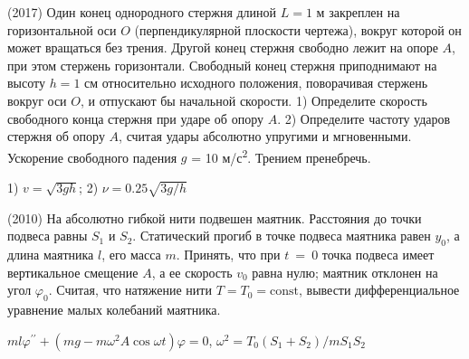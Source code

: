 \begin{ex}
(2017) Один конец однородного стержня длиной $L=1$ м закреплен на горизонтальной оси $O$ (перпендикулярной плоскости чертежа), вокруг которой он может вращаться без трения. Другой конец стержня свободно лежит на опоре $A$, при этом стержень горизонтали. Свободный конец стержня приподнимают на высоту $h = 1$ см относительно исходного положения, поворачивая стержень
вокруг оси $O$, и отпускают бы начальной скорости. 1) Определите скорость
свободного конца стержня при ударе об опору $A$. 2) Определите частоту ударов
стержня об опору $A$, считая удары абсолютно упругими и мгновенными.
Ускорение свободного падения $g$ = 10 м/с\textsuperscript{2}. Трением пренебречь.
\begin{center}

\end{center}
\begin{ans}
1) $v=\sqrt{3gh}$; 2) $\nu = 0.25\sqrt{3g/h }$
\end{ans}
\end{ex}

\begin{ex}
(2010) На абсолютно гибкой нити подвешен маятник. Расстояния до точки подвеса равны $S_1$ и $S_2$. 
Статический прогиб в точке подвеса маятника равен $y_0$, а длина маятника $l$, его масса $m$. 
Принять, что при $t$~=~0 точка подвеса имеет вертикальное смещение $A$, а ее скорость $v_0$ равна нулю; маятник отклонен на угол $\varphi_0$. 
Считая, что натяжение нити $T = T_0 = \text{const}$, вывести дифференциальное уравнение малых колебаний маятника.
\begin{center}

\end{center}
\begin{ans}
$ml \varphi^{\prime \prime} + (mg-m \omega^2 A \cos \omega t) \varphi = 0$, $\omega^2 = T_0(S_1+S_2)/m S_1 S_2$
\end{ans}
\end{ex}


